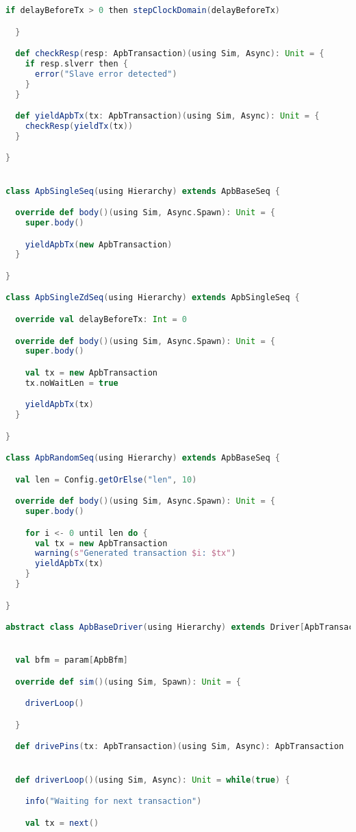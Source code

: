 \begin{lstlisting}[language=scala, captionpos=b, caption=Test code for the APB Didactic SoC subsystem.,label=lst:apb_test]
    if delayBeforeTx > 0 then stepClockDomain(delayBeforeTx)

  }

  def checkResp(resp: ApbTransaction)(using Sim, Async): Unit = {
    if resp.slverr then {
      error("Slave error detected")
    }
  }

  def yieldApbTx(tx: ApbTransaction)(using Sim, Async): Unit = {
    checkResp(yieldTx(tx))
  }

}


class ApbSingleSeq(using Hierarchy) extends ApbBaseSeq {

  override def body()(using Sim, Async.Spawn): Unit = {
    super.body()

    yieldApbTx(new ApbTransaction)
  }

}

class ApbSingleZdSeq(using Hierarchy) extends ApbSingleSeq {

  override val delayBeforeTx: Int = 0

  override def body()(using Sim, Async.Spawn): Unit = {
    super.body()

    val tx = new ApbTransaction
    tx.noWaitLen = true

    yieldApbTx(tx)
  }

}

class ApbRandomSeq(using Hierarchy) extends ApbBaseSeq {

  val len = Config.getOrElse("len", 10)

  override def body()(using Sim, Async.Spawn): Unit = {
    super.body()

    for i <- 0 until len do {
      val tx = new ApbTransaction
      warning(s"Generated transaction $i: $tx")
      yieldApbTx(tx)
    }
  }

}

abstract class ApbBaseDriver(using Hierarchy) extends Driver[ApbTransaction, ApbTransaction] {


  val bfm = param[ApbBfm]

  override def sim()(using Sim, Spawn): Unit = {

    driverLoop()

  }

  def drivePins(tx: ApbTransaction)(using Sim, Async): ApbTransaction


  def driverLoop()(using Sim, Async): Unit = while(true) {

    info("Waiting for next transaction")

    val tx = next()


\end{lstlisting}
